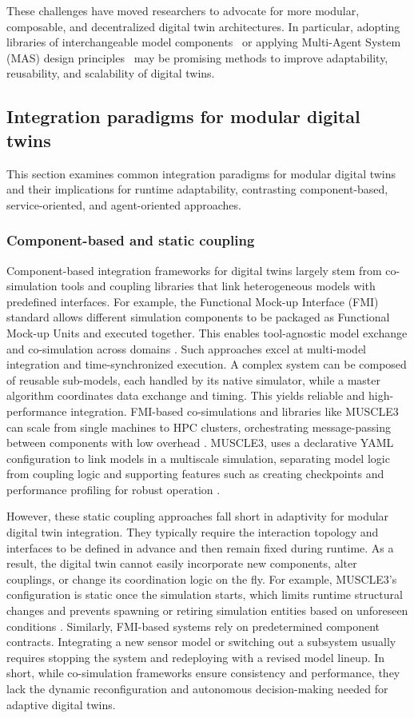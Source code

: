 These challenges have moved researchers to advocate for more modular, composable, and decentralized digital twin architectures. In particular, adopting libraries of interchangeable model components~\cite{Kapteyn2020} or applying Multi-Agent System (MAS) design principles~\cite{Kalyani2024Survey, Pretel2024SLR, Lehmann2023, Siatras2024} may be promising methods to improve adaptability, reusability, and scalability of digital twins.

\subsection{Integration paradigms for modular digital twins}
This section examines common integration paradigms for modular digital twins and their implications for runtime adaptability, contrasting component-based, service-oriented, and agent-oriented approaches.

\subsubsection{Component-based and static coupling}
Component-based integration frameworks for digital twins largely stem from co-simulation tools and coupling libraries that link heterogeneous models with predefined interfaces. For example, the Functional Mock-up Interface (FMI) standard allows different simulation components to be packaged as Functional Mock-up Units and executed together. This enables tool-agnostic model exchange and co-simulation across domains \cite{blochwitz2012fmi20}. Such approaches excel at multi-model integration and time-synchronized execution. A complex system can be composed of reusable sub-models, each handled by its native simulator, while a master algorithm coordinates data exchange and timing. This yields reliable and high-performance integration. FMI-based co-simulations and libraries like MUSCLE3 can scale from single machines to HPC clusters, orchestrating message-passing between components with low overhead \cite{muscle3docs}. MUSCLE3,  uses a declarative YAML configuration to link models in a multiscale simulation, separating model logic from coupling logic and supporting features such as creating checkpoints and performance profiling for robust operation \cite{muscle3docs}.

However, these static coupling approaches fall short in adaptivity for modular digital twin integration. They typically require the interaction topology and interfaces to be defined in advance and then remain fixed during runtime. As a result, the digital twin cannot easily incorporate new components, alter couplings, or change its coordination logic on the fly. For example, MUSCLE3's configuration is static once the simulation starts, which limits runtime structural changes and prevents spawning or retiring simulation entities based on unforeseen conditions \cite{muscle3docs}. Similarly, FMI-based systems rely on predetermined component contracts. Integrating a new sensor model or switching out a subsystem usually requires stopping the system and redeploying with a revised model lineup. In short, while co-simulation frameworks ensure consistency and performance, they lack the dynamic reconfiguration and autonomous decision-making needed for adaptive digital twins.

